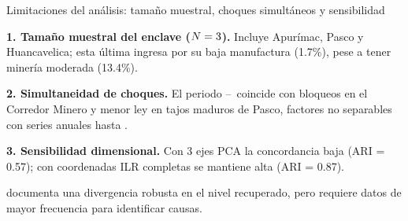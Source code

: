 \documentclass[aspectratio=169,11pt]{beamer}
\begin{document}
\begin{frame}[t]{Limitaciones del análisis: tamaño muestral, choques simultáneos y sensibilidad}
\vspace{.06cm}
\begin{keybox}
\textbf{1. Tamaño muestral del enclave ($N=3$).} Incluye Apurímac, Pasco y Huancavelica; esta última ingresa por su baja manufactura (1.7\%), pese a tener minería moderada (13.4\%).\par\smallskip
\textbf{2. Simultaneidad de choques.} El periodo \PostStart--\PostEnd\ coincide con bloqueos en el Corredor Minero y menor ley en tajos maduros de Pasco, factores no separables con series anuales hasta \LevelEnd.\par\smallskip
\textbf{3. Sensibilidad dimensional.} Con 3 ejes PCA la concordancia baja (ARI = 0.57); con coordenadas ILR completas se mantiene alta (ARI = 0.87).
\end{keybox}
\vspace{.08cm}
\begin{simplebox}
 documenta una divergencia robusta en el nivel recuperado, pero requiere datos de mayor frecuencia para identificar causas.
\end{simplebox}
\end{frame}
\end{document}
